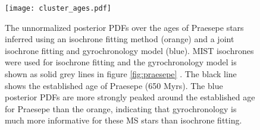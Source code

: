 \begin{figure}
  \caption{
    The unnormalized posterior PDFs over the ages of Praesepe stars inferred
    using an isochrone fitting method (orange) and a joint isochrone fitting
    and gyrochronology model (blue).
    MIST isochrones were used for isochrone fitting and the gyrochronology
    model is shown as solid grey lines in
    figure \ref{fig:praesepe} \citep{angus2015}.
    The black line shows the established age of Praesepe (650 Myrs).
    The blue posterior PDFs are more strongly peaked around the established
    age for Praesepe than the orange, indicating that gyrochronology is much
    more informative for these MS stars than isochrone fitting.
}
  \centering
    \texttt{[image: cluster\_ages.pdf]}
\label{fig:cluster_ages}
\end{figure}



